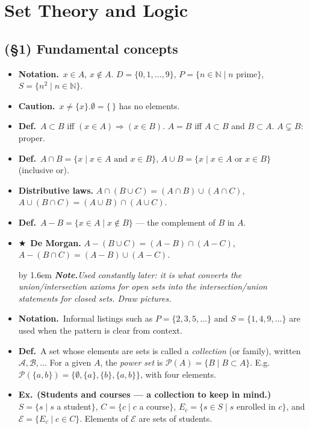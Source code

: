 \documentclass[12pt,a4paper]{article}
\newcommand{\Dfn}{\textbf{Def.}~}
\newcommand{\Exa}{\textbf{Ex.}~}
\newcommand{\Ntn}{\textbf{Notation.}~}
\newcommand{\Warn}{\textbf{Caution.}~}
\newcommand{\Key}{$\bigstar$~}                  %
\newcommand{\Cue}[1]{%
  \par\addvspace{7pt}\nopagebreak
  \begingroup
    \advance\leftskip by 1.6em
    \parindent=0pt \small\color{cue}%
    \textbf{\textit{Note.}}\enspace \textit{#1}\par
  \endgroup
  \addvspace{9pt}}
\newenvironment{BL}%
  {\begin{itemize}[leftmargin=1.4em,labelsep=0.55em,itemsep=11pt,topsep=11pt,parsep=0pt]}%
  {\end{itemize}}
\newcommand{\NN}{\mathbb{N}}
\newcommand{\cB}{\mathcal{B}}
\newcommand{\cA}{\mathcal{A}}
\newcommand{\Pow}{\mathcal{P}}
\newcommand{\imp}{\Rightarrow}
\begin{document}
\section{Set Theory and Logic}

\subsection{(\S1) Fundamental concepts}

\begin{BL}
\item \Ntn $x\in A$, $x\notin A$.\quad
      $D=\{0,1,\dots,9\}$,\; $P=\{n\in\NN\mid n\text{ prime}\}$,\; $S=\{n^2\mid n\in\NN\}$.
\item \Warn $x\neq\{x\}$.\quad $\emptyset=\{\,\}$ has no elements.
\item \Dfn $A\subset B$ iff $(x\in A)\imp(x\in B)$.\quad
      $A=B$ iff $A\subset B$ and $B\subset A$.\quad
      $A\subsetneq B$: proper.
\item \Dfn $A\cap B=\{x\mid x\in A\text{ and }x\in B\}$,\quad
      $A\cup B=\{x\mid x\in A\text{ or }x\in B\}$ (inclusive or).
\item \textbf{Distributive laws.}
      \(A\cap(B\cup C)=(A\cap B)\cup(A\cap C)\),\quad
      \(A\cup(B\cap C)=(A\cup B)\cap(A\cup C)\).
\item \Dfn $A-B=\{x\in A\mid x\notin B\}$ --- the complement of $B$ in $A$.
\item \Key\textbf{De Morgan.}
      \(A-(B\cup C)=(A-B)\cap(A-C)\),\quad
      \(A-(B\cap C)=(A-B)\cup(A-C)\).
\Cue{Used constantly later: it is what converts the union/intersection axioms for open sets
into the intersection/union statements for closed sets. Draw pictures.}
\item \Ntn Informal listings such as $P=\{2,3,5,\dots\}$ and $S=\{1,4,9,\dots\}$ are used when
      the pattern is clear from context.
\item \Dfn A set whose elements are sets is called a \emph{collection} (or family),
      written $\cA,\cB,\dots$
      For a given $A$, the \emph{power set} is $\Pow(A)=\{B\mid B\subset A\}$.
      E.g.\ $\Pow(\{a,b\})=\{\emptyset,\{a\},\{b\},\{a,b\}\}$, with four elements.
\item \Exa \textbf{(Students and courses --- a collection to keep in mind.)}
      $S=\{s\mid s$ a student$\}$, $C=\{c\mid c$ a course$\}$,
      $E_c=\{s\in S\mid s$ enrolled in $c\}$, and $\mathscr{E}=\{E_c\mid c\in C\}$.
      Elements of $\mathscr{E}$ are sets of students.

\end{BL}
\end{document}
